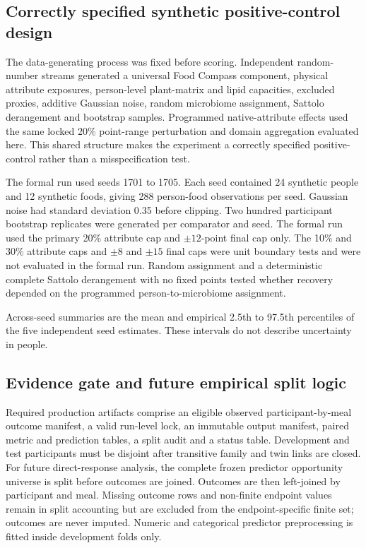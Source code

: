 \subsection*{Correctly specified synthetic positive-control design}

The data-generating process was fixed before scoring. Independent random-number
streams generated a universal Food Compass component, physical attribute
exposures, person-level plant-matrix and lipid capacities, excluded proxies,
additive Gaussian noise, random microbiome assignment, Sattolo derangement and
bootstrap samples. Programmed native-attribute effects used the same locked
20\% point-range perturbation and domain aggregation evaluated here. This
shared structure makes the experiment a correctly specified positive-control
rather than a misspecification test.

The formal run used seeds 1701 to 1705. Each seed contained 24 synthetic people
and 12 synthetic foods, giving 288 person-food observations per seed. Gaussian
noise had standard deviation 0.35 before clipping. Two hundred participant
bootstrap replicates were generated per comparator and seed. The formal run
used the primary 20\% attribute cap and \(\pm 12\)-point final cap only. The
10\% and 30\% attribute caps and \(\pm 8\) and \(\pm 15\) final caps were unit
boundary tests and were not evaluated in the formal run. Random assignment and a
deterministic complete Sattolo derangement with no fixed points tested whether
recovery depended on the programmed person-to-microbiome assignment.

Across-seed summaries are the mean and empirical 2.5th to 97.5th percentiles of
the five independent seed estimates. These intervals do not describe
uncertainty in people.

\subsection*{Evidence gate and future empirical split logic}

Required production artifacts comprise an eligible observed participant-by-meal
outcome manifest, a valid run-level lock, an immutable output manifest, paired
metric and prediction tables, a split audit and a status table. Development
and test participants must be disjoint after transitive family and twin links
are closed. For future direct-response analysis, the complete frozen predictor
opportunity universe is split before outcomes are joined. Outcomes are then
left-joined by participant and meal. Missing outcome rows and non-finite endpoint
values remain in split accounting but are excluded from the endpoint-specific
finite set; outcomes are never imputed. Numeric and categorical predictor
preprocessing is fitted inside development folds only.


